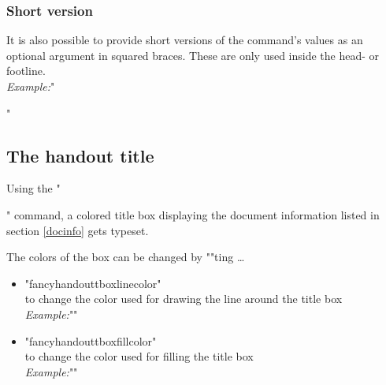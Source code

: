 \documentclass[11pt]{ltxdoc}
\begin{document}
	\subsubsection*{Short version}
	It is also possible to provide short versions of the command's values as an optional argument in squared braces.
	These are only used inside the head- or footline. \\[\smallskipamount]
	\textit{Example:}\quad "\author[S. Friedl]{Sebastian Friedl}"
	
	
	\subsection{The handout title}
	\DescribeMacro{\maketitle}
	Using the "\maketitle" command, a colored title box displaying the document information listed in section \ref{docinfo} gets typeset.
	
	\medskip
	The colors of the box can be changed by ""ting …
	\begin{itemize}
		\item "fancyhandouttboxlinecolor" \\
			to change the color used for drawing the line around the title box \\[\smallskipamount]
			\textit{Example:}\quad ""
		
		\item "fancyhandouttboxfillcolor" \\
			to change the color used for filling the title box \\[\smallskipamount]
			\textit{Example:}\quad ""
	\end{itemize}
	
	
\end{document}
